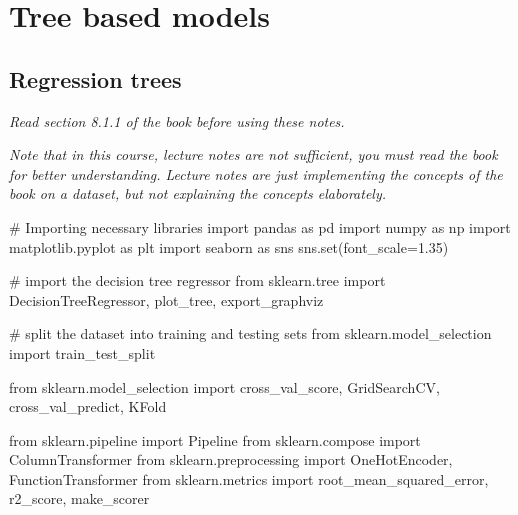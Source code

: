 \documentclass[
  letterpaper,
  DIV=11,
  numbers=noendperiod]{scrreprt}
\newenvironment{Shaded}{\begin{snugshade}}{\end{snugshade}}
\newcommand{\BuiltInTok}[1]{\textcolor[rgb]{0.00,0.23,0.31}{#1}}
\newcommand{\CommentTok}[1]{\textcolor[rgb]{0.37,0.37,0.37}{#1}}
\newcommand{\FloatTok}[1]{\textcolor[rgb]{0.68,0.00,0.00}{#1}}
\newcommand{\ImportTok}[1]{\textcolor[rgb]{0.00,0.46,0.62}{#1}}
\newcommand{\NormalTok}[1]{\textcolor[rgb]{0.00,0.23,0.31}{#1}}
\newcommand{\OperatorTok}[1]{\textcolor[rgb]{0.37,0.37,0.37}{#1}}
\begin{document}
\part{Tree based models}

\chapter{Regression trees}\label{regression-trees}

\emph{Read section 8.1.1 of the book before using these notes.}

\emph{Note that in this course, lecture notes are not sufficient, you
must read the book for better understanding. Lecture notes are just
implementing the concepts of the book on a dataset, but not explaining
the concepts elaborately.}

\begin{Shaded}
\begin{Highlighting}[]
\CommentTok{\# Importing necessary libraries}
\ImportTok{import}\NormalTok{ pandas }\ImportTok{as}\NormalTok{ pd}
\ImportTok{import}\NormalTok{ numpy }\ImportTok{as}\NormalTok{ np}
\ImportTok{import}\NormalTok{ matplotlib.pyplot }\ImportTok{as}\NormalTok{ plt}
\ImportTok{import}\NormalTok{ seaborn }\ImportTok{as}\NormalTok{ sns}
\NormalTok{sns.}\BuiltInTok{set}\NormalTok{(font\_scale}\OperatorTok{=}\FloatTok{1.35}\NormalTok{)}

\CommentTok{\# import the decision tree regressor}
\ImportTok{from}\NormalTok{ sklearn.tree }\ImportTok{import}\NormalTok{ DecisionTreeRegressor, plot\_tree, export\_graphviz}

\CommentTok{\# split the dataset into training and testing sets}
\ImportTok{from}\NormalTok{ sklearn.model\_selection }\ImportTok{import}\NormalTok{ train\_test\_split}


\ImportTok{from}\NormalTok{ sklearn.model\_selection }\ImportTok{import}\NormalTok{ cross\_val\_score, GridSearchCV, cross\_val\_predict, KFold}

\ImportTok{from}\NormalTok{ sklearn.pipeline }\ImportTok{import}\NormalTok{ Pipeline}
\ImportTok{from}\NormalTok{ sklearn.compose }\ImportTok{import}\NormalTok{ ColumnTransformer}
\ImportTok{from}\NormalTok{ sklearn.preprocessing }\ImportTok{import}\NormalTok{ OneHotEncoder, FunctionTransformer}
\ImportTok{from}\NormalTok{ sklearn.metrics }\ImportTok{import}\NormalTok{ root\_mean\_squared\_error, r2\_score, make\_scorer}
\end{Highlighting}
\end{Shaded}
\end{document}
